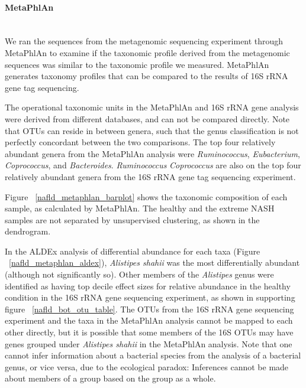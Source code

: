 \FloatBarrier

\paragraph{MetaPhlAn}\mbox{}\\
We ran the sequences from the metagenomic sequencing experiment through MetaPhlAn to examine if the taxonomic profile derived from the metagenomic sequences was similar to the taxonomic profile we measured. MetaPhlAn generates taxonomy profiles that can be compared to the results of 16S rRNA gene tag sequencing.

The operational taxonomic units in the MetaPhlAn and 16S rRNA gene analysis were derived from different databases, and can not be compared directly. Note that OTUs can reside in between genera, such that the genus classification is not perfectly concordant between the two comparisons. The top four relatively abundant genera from the MetaPhlAn analysis were \textit{Ruminococcus}, \textit{Eubacterium}, \textit{Coprococcus}, and \textit{Bacteroides}. \textit{Ruminococcus} \textit{Coprococcus} are also on the top four relatively abundant genera from the 16S rRNA gene tag sequencing experiment.

Figure ~\ref{nafld_metaphlan_barplot} shows the taxonomic composition of each sample, as calculated by MetaPhlAn. The healthy and the extreme NASH samples are not separated by unsupervised clustering, as shown in the dendrogram.

In the ALDEx analysis of differential abundance for each taxa (Figure ~\ref{nafld_metaphlan_aldex}), \textit{Alistipes shahii} was the most differentially abundant (although not significantly so). Other members of the \textit{Alistipes} genus were identified as having top decile effect sizes for relative abundance in the healthy condition in the 16S rRNA gene sequencing experiment, as shown in supporting figure ~\ref{nafld_bot_otu_table}. The OTUs from the 16S rRNA gene sequencing experiment and the taxa in the MetaPhlAn analysis cannot be mapped to each other directly, but it is possible that some members of the 16S OTUs may have genes grouped under \textit{Alistipes shahii} in the MetaPhlAn analysis. Note that one cannot infer information about a bacterial species from the analysis of a bacterial genus, or vice versa, due to the ecological paradox: Inferences cannot be made about members of a group based on the group as a whole.

